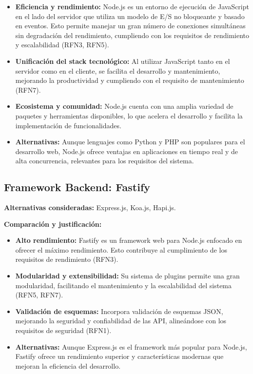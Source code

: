 \begin{itemize} 
	\item \textbf{Eficiencia y rendimiento:} Node.js es un entorno de ejecución de JavaScript en el lado del servidor que utiliza un modelo de E/S no bloqueante y basado en eventos. Esto permite manejar un gran número de conexiones simultáneas sin degradación del rendimiento, cumpliendo con los requisitos de rendimiento y escalabilidad (RFN3, RFN5).
	
	\item \textbf{Unificación del stack tecnológico:} Al utilizar JavaScript tanto en el servidor como en el cliente, se facilita el desarrollo y mantenimiento, mejorando la productividad y cumpliendo con el requisito de mantenimiento (RFN7).
	
	\item \textbf{Ecosistema y comunidad:} Node.js cuenta con una amplia variedad de paquetes y herramientas disponibles, lo que acelera el desarrollo y facilita la implementación de funcionalidades.
	
	\item \textbf{Alternativas:} Aunque lenguajes como Python y PHP son populares para el desarrollo web, Node.js ofrece ventajas en aplicaciones en tiempo real y de alta concurrencia, relevantes para los requisitos del sistema.
	
\end{itemize}

\subsection{Framework Backend: Fastify}

\textbf{Alternativas consideradas:} Express.js, Koa.js, Hapi.js.

\textbf{Comparación y justificación:}

\begin{itemize} 
	\item \textbf{Alto rendimiento:} Fastify es un framework web para Node.js enfocado en ofrecer el máximo rendimiento. Esto contribuye al cumplimiento de los requisitos de rendimiento (RFN3).
	
	\item \textbf{Modularidad y extensibilidad:} Su sistema de plugins permite una gran modularidad, facilitando el mantenimiento y la escalabilidad del sistema (RFN5, RFN7).
	
	\item \textbf{Validación de esquemas:} Incorpora validación de esquemas JSON, mejorando la seguridad y confiabilidad de las API, alineándose con los requisitos de seguridad (RFN1).
	
	\item \textbf{Alternativas:} Aunque Express.js es el framework más popular para Node.js, Fastify ofrece un rendimiento superior y características modernas que mejoran la eficiencia del desarrollo.
	
\end{itemize}

